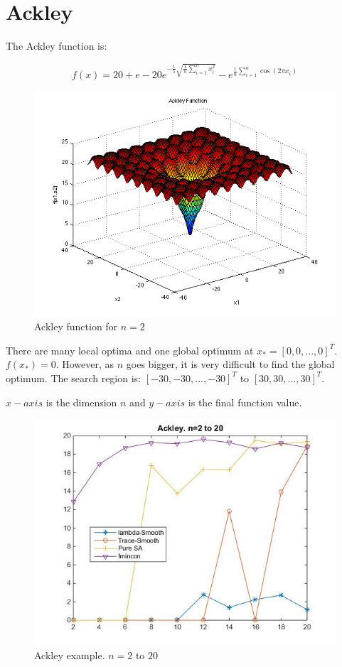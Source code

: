 \documentclass[letterpaper,12pt,titlepage,oneside,final]{book}
\begin{document}
\section{Ackley}

The Ackley function is:

\begin{equation}
f(x)=20+e-20e^{-\frac{1}{5}\sqrt{\frac{1}{n}\sum_{i=1}^nx_i^2}}-e^{\frac{1}{n}\sum_{i=1}^n\cos(2\pi x_i)}
\end{equation}

\begin{figure}[H]
\includegraphics[scale=0.75]{ackley.png}
\caption{Ackley function for $n=2$}
\end{figure}

There are many local optima and one global optimum at $x_*=[0,0,...,0]^T$. $f(x_*)=0$. However, as $n$ goes bigger, it is very difficult to find the global optimum. The search region is: $[-30,-30,...,-30]^T$ to $[30,30,...,30]^T$. 

$x-axis$ is the dimension $n$ and $y-axis$ is the final function value.

\begin{figure}[H]
\includegraphics[scale=0.7]{ackley1.jpg}
\caption{Ackley example. $n=2$ to $20$}
\end{figure}
\end{document}
